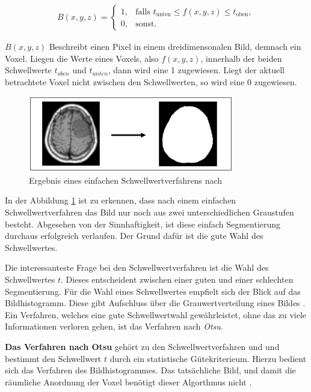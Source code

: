 \begin{align}
	\label{equ:schwellwertverfahren}B(x, y, z) = \begin{cases}1,&\text{falls }t_{\text{unten}}\leq f(x, y, z) \leq t_{\text{oben}}, \\ 0,&\text{sonst}.\end{cases}
\end{align}

$B(x, y, z)$ Beschreibt einen Pixel in einem dreidimensonalen Bild, demnach ein Voxel.
Liegen die Werte eines Voxels, also $f(x, y, z)$, innerhalb der beiden
Schwellwerte $t_{oben}$ und $t_{unten}$, dann wird eine 1 zugewiesen. Liegt der
aktuell betrachtete Voxel nicht zwischen den Schwellwerten, so wird eine 0 zugewiesen.

\begin{figure}[h]
	\centering
	\includegraphics[width=0.8\textwidth]{img/beispiel_schwellwertverfahren.jpg}
	\caption{Ergebnis eines einfachen Schwellwertverfahrens nach \citet[Seite 96]{handels2000}}
	\label{fig:binäres_schwellwertverfahren}
\end{figure}

In der Abbildung \ref{fig:binäres_schwellwertverfahren} ist zu erkennen, dass nach
einem einfachen Schwellwertverfahren das Bild nur noch aus zwei unterschiedlichen
Graustufen besteht. Abgesehen von der Sinnhaftigkeit, ist diese einfach Segmentierung
durchaus erfolgreich verlaufen. Der Grund dafür ist die gute Wahl des
Schwellwertes.

Die interessanteste Frage bei den Schwellwertverfahren ist die Wahl des
Schwellwertes $t$. Dieses entscheident zwischen einer guten und einer schlechten
Segmentierung. Für die Wahl eines Schwellwertes empfielt sich der Blick auf das
Bildhistogramm. Diese gibt Aufschluss über die Grauwertverteilung eines Bildes \citep[vgl.][Seite361]{lehmann2013bildverarbeitung}.
Ein Verfahren, welches eine gute Schwellwertwahl gewährleistet, ohne das zu
viele Informationen verloren gehen, ist das Verfahren nach \textit{Otsu}.

\pagebreak

\textbf{Das Verfahren nach Otsu} gehört zu den Schwellwertverfahren und und
bestimmt den Schwellwert $t$ durch ein statistische Gütekriterieum. Hierzu bedient
sich das Verfahren des Bildhistogrammes. Das tatsächliche Bild, und damit die räumliche
Anordnung der Voxel benötigt dieser Algorthmus nicht \citep[vgl.][Seite 264]{lehmann2013bildverarbeitung}.

